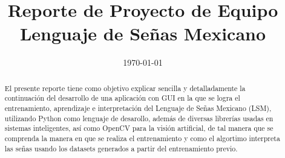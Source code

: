 \documentclass[conference]{IEEEtran}
\date{\specialdate\today}
\begin{document}
%
%
%

\newcommand{\breite}{0.9} %
\newcommand{\RelacionFiguradoscolumnas}{0.9}
\newcommand{\RelacionFiguradoscolumnasPuntoCinco}{0.45}




\title{Reporte de Proyecto de Equipo \\ 
Lenguaje de Señas Mexicano}

\author{
}



\maketitle

\begin{abstract} 

El presente reporte tiene como objetivo explicar sencilla y detalladamente la continuación del desarrollo de una aplicación con GUI en la que se logra el entrenamiento, aprendizaje e interpretación del Lenguaje de Señas Mexicano (LSM), utilizando Python como lenguaje de desarollo, además de diversas librerías usadas en sistemas inteligentes, así como OpenCV para la visión artificial, de tal manera que se comprenda la manera en que se realiza el entrenamiento y como el algortimo interpreta las señas usando los datasets generados a partir del entrenamiento previo.

\end{abstract}
\end{document}
